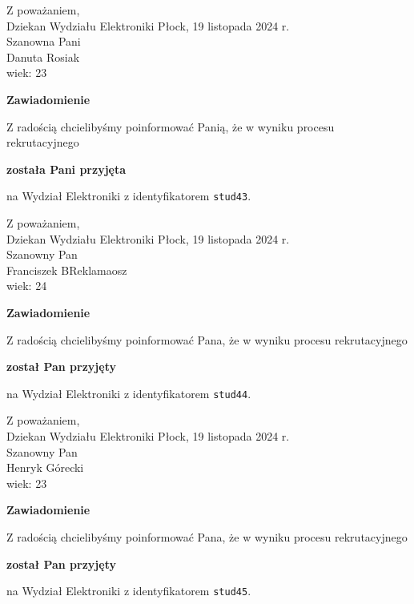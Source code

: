 \documentclass[12pt,a4paper]{article}
\begin{document}
\noindent
Z poważaniem,\\
Dziekan
Wydziału Elektroniki
\newpage
\hfill Płock, 19 listopada 2024 r.\\ 
\noindent 
Szanowna Pani \\
Danuta Rosiak \\
wiek: 23

\bigskip

\begin{center}
{\Large\textbf{Zawiadomienie}}
\end{center}
\bigskip
Z radością chcielibyśmy poinformować Panią, że w wyniku procesu rekrutacyjnego
\begin{center}
\textsf{\textbf{została Pani przyjęta}} 
\end{center}
na Wydział Elektroniki z identyfikatorem \verb|stud43|.
\vspace{2cm}

\noindent
Z poważaniem,\\
Dziekan
Wydziału Elektroniki
\newpage
\hfill Płock, 19 listopada 2024 r.\\ 
\noindent 
Szanowny Pan \\
Franciszek BReklamaosz \\
wiek: 24

\bigskip

\begin{center}
{\Large\textbf{Zawiadomienie}}
\end{center}
\bigskip
Z radością chcielibyśmy poinformować Pana, że w wyniku procesu rekrutacyjnego
\begin{center}
\textsf{\textbf{został Pan przyjęty}} 
\end{center}
na Wydział Elektroniki z identyfikatorem \verb|stud44|.
\vspace{2cm}

\noindent
Z poważaniem,\\
Dziekan
Wydziału Elektroniki
\newpage
\hfill Płock, 19 listopada 2024 r.\\ 
\noindent 
Szanowny Pan \\
Henryk Górecki \\
wiek: 23

\bigskip

\begin{center}
{\Large\textbf{Zawiadomienie}}
\end{center}
\bigskip
Z radością chcielibyśmy poinformować Pana, że w wyniku procesu rekrutacyjnego
\begin{center}
\textsf{\textbf{został Pan przyjęty}} 
\end{center}
na Wydział Elektroniki z identyfikatorem \verb|stud45|.
\vspace{2cm}
\end{document}
